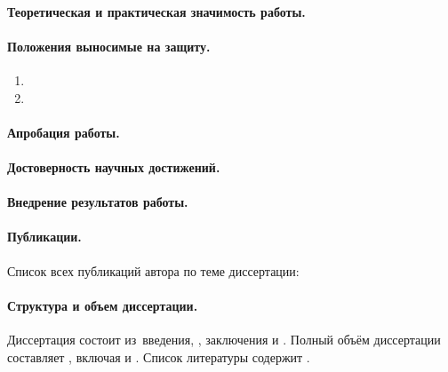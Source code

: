 \paragraph*{Теоретическая и практическая значимость работы.}

\paragraph*{Положения выносимые на защиту.}
\begin{enumerate}
    \item \statementOneRU
    \item \statementTwoRU 
\end{enumerate}

\paragraph*{Апробация работы.}

\paragraph*{Достоверность научных достижений.}

\paragraph*{Внедрение результатов работы.}

\paragraph*{Публикации.} Список всех публикаций автора по теме диссертации:
\begin{refsection}
\nocite{*}
\printbibliography[
    keyword=own,
    heading=none,
    resetnumbers=true
]
\end{refsection}



\paragraph*{Структура и объем диссертации. }
Диссертация состоит из~введения,
,
заключения и
.
Полный объём диссертации составляет
, включая
 и
.
Список литературы содержит
.